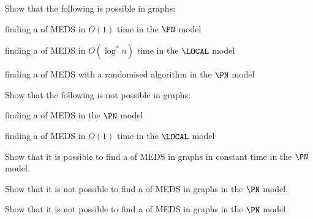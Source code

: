 \begin{ex}
    Show that the following is possible in  graphs:
    \begin{subex}
        \item finding a  of MEDS in $O(1)$ time in the $\PN$ model
        \item finding a  of MEDS in $O(\log^* n)$ time in the $\LOCAL$ model
        \item finding a  of MEDS with a randomised algorithm in the $\PN$ model
    \end{subex}
\end{ex}

\begin{exs}
    Show that the following is not possible in  graphs:
    \begin{subex}
        \item finding a  of MEDS in the $\PN$ model
        \item finding a  of MEDS in $O(1)$ time in the $\LOCAL$ model
    \end{subex}
\end{exs}

\begin{ex}
    Show that it is possible to find a  of MEDS in  graphs in constant time in the $\PN$ model.
    
\end{ex}

\begin{ex}
    Show that it is not possible to find a  of MEDS in  graphs in the $\PN$ model.
    
\end{ex}

\begin{ex}
    Show that it is not possible to find a  of MEDS in  graphs in the $\PN$ model.
    
\end{ex}

